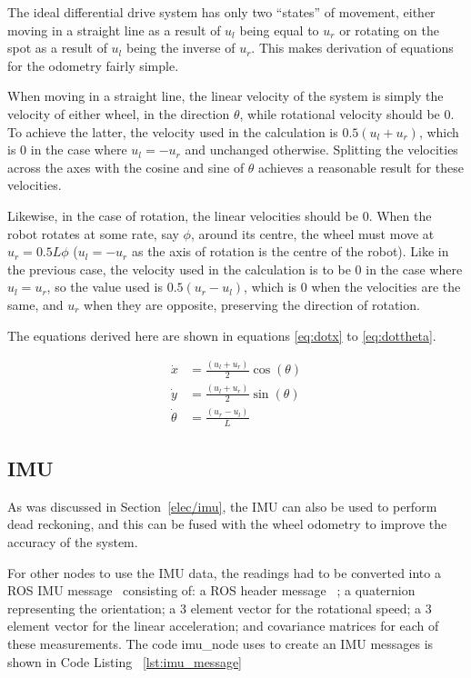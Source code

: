 The ideal differential drive system has only two ``states'' of movement, either
moving in a straight line as a result of $u_l$ being equal to $u_r$ or rotating on
the spot as a result of $u_l$ being the inverse of $u_r$. This makes derivation of
equations for the odometry fairly simple.

When moving in a straight line, the linear velocity of the system is simply the
velocity of either wheel, in the direction $\theta$, while rotational velocity
should be $0$. To achieve the latter, the velocity used in the calculation is $0.5 (u_l + u_r)$, which is $0$ in the case where $u_l = -u_r$ and unchanged otherwise.
Splitting the velocities across the axes with the cosine and sine of $\theta$ achieves a reasonable result for these velocities.

Likewise, in the case of rotation, the linear velocities should be $0$. When the
robot rotates at some rate, say $\phi$, around its centre, the wheel must move at $u_r = 0.5 L \phi$ ($u_l = -u_r$ as the axis of rotation is the centre of the
robot). Like in the previous case, the velocity used in the calculation is to be 0
in the case where $u_l = u_r$, so the value
used is $0.5 (u_r - u_l)$, which is $0$ when the velocities are the same, and $u_r$ when they are opposite, preserving the direction of rotation.

The equations derived here are shown in equations \ref{eq:dotx} to \ref{eq:dottheta}.


\begin{align}
\dot{x} & = \frac{(u_l + u_r)}{2} \cos(\theta) \label{eq:dotx} \\
\dot{y} & = \frac{(u_l + u_r)}{2} \sin(\theta) \label{eq:doty} \\
\dot{\theta} & = \frac{(u_r - u_l)}{L} \label{eq:dottheta}
\end{align}

\subsection{IMU}\label{soft/odometry/imu}

As was discussed in Section~\ref{elec/imu}, the IMU can also be used to
perform dead reckoning, and this can be fused with the wheel odometry to
improve the accuracy of the system.

For other nodes to use the IMU data, the readings had to be converted into
a ROS IMU message~\cite[sensor\_msgs/Imu.msg]{ROSDocs} consisting of: a ROS header message~
\cite[std\_msgs/Header.msg]{ROSDocs}; a quaternion representing the orientation; a 3
element vector for the rotational speed; a 3 element vector for the linear
acceleration; and covariance matrices for each of these measurements. The
code imu\_node uses to create an IMU messages is shown in Code Listing~
\ref{lst:imu_message}


